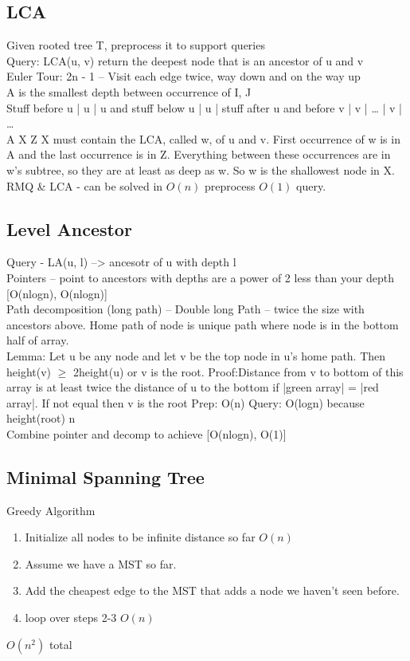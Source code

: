 \documentclass[8pt,twocolumn]{article}
\begin{document}
\subsection{LCA}
Given rooted tree T, preprocess it to support queries\\
Query: LCA(u, v) return the deepest node that is an ancestor of u and v\\
Euler Tour:
2n - 1 -- Visit each edge twice, way down and on the way up\\
A is the smallest depth between occurrence of I, J\\
Stuff before u | u | u and stuff below u | u | stuff after u and before v | v | … | v | …\\
    A                       X             Z
X must contain the LCA, called w, of u and v.  First occurrence of w is in A and the last occurrence is in Z.
Everything between these occurrences are in w’s subtree, so they are at least as deep as w.  So w is the shallowest node in X.\\
RMQ \& LCA - can be solved in $O(n)$ preprocess $O(1)$ query.

\subsection{Level Ancestor}
Query - LA(u, l) --> ancesotr of u with depth l\\
Pointers -- point to ancestors with depths are a power of 2 less than your depth [O(nlogn), O(nlogn)]\\
Path decomposition (long path) -- Double long Path -- twice the size with ancestors above.
Home path of node is unique path where node is in the bottom half of array.\\
Lemma: Let u be any node and let v be the top node in u's home path.  Then height(v) $\geq$ 2height(u) or v is the root.
Proof:Distance from v to bottom of this array is at least twice the distance of u to the bottom if |green array| = |red array|.  If not equal then v is the root
Prep: O(n)
Query: O(logn)  because height(root) n\\
Combine pointer and decomp to achieve [O(nlogn), O(1)]

\subsection{Minimal Spanning Tree}
Greedy Algorithm
\begin{enumerate}
    \item Initialize all nodes to be infinite distance so far $O(n)$
    \item Assume we have a MST so far.
    \item Add the cheapest edge to the MST that adds a node we haven't seen before.
    \item loop over steps 2-3 $O(n)$
\end{enumerate}
$O(n^2)$ total\\
\end{document}
